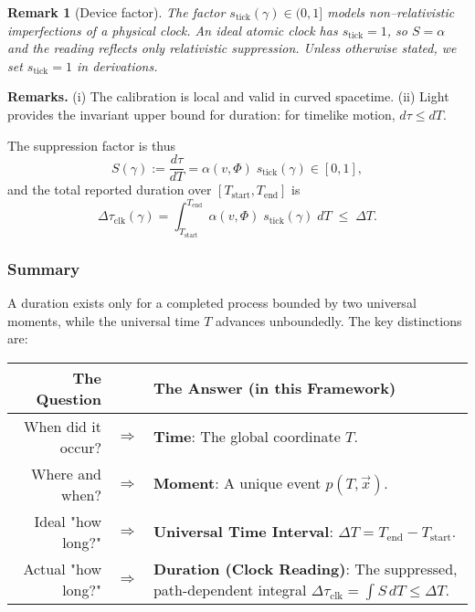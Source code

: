 \documentclass[12pt]{article}
\theoremstyle{plain}
\newtheorem{remark}{Remark}
\newcommand{\stick}{s_{\mathrm{tick}}}
\begin{document}
\begin{remark}[Device factor]
The factor $\stick(\gamma)\in(0,1]$ models non–relativistic imperfections of a physical clock. An \emph{ideal} atomic clock has $s_{\mathrm{tick}}=1$, so $S=\alpha$ and the reading reflects only relativistic suppression. Unless otherwise stated, we set $s_{\mathrm{tick}}=1$ in derivations.
\end{remark}

\noindent\textbf{Remarks.}
(i) The calibration is local and valid in curved spacetime.
(ii) Light provides the invariant upper bound for duration: for timelike motion, $d\tau\le dT$.

\medskip
\noindent The suppression factor is thus
\begin{equation}
S(\gamma):=\frac{d\tau}{dT}=\alpha(v,\Phi)\; \stick(\gamma)\in[0,1],
\label{eq:Suppression}
\end{equation}
and the total reported duration over $[T_{\mathrm{start}},T_{\mathrm{end}}]$ is
\begin{equation}
\Delta \tau_{\mathrm{clk}}(\gamma)
= \int_{T_{\mathrm{start}}}^{T_{\mathrm{end}}}
   \alpha(v,\Phi)\;\stick(\gamma)\; dT
\;\le\; \Delta T .
\label{eq:clkDuration}
\end{equation}

\subsubsection*{Summary}
A duration exists only for a completed process bounded by two universal moments, while the universal time $T$ advances unboundedly. The key distinctions are:

\begin{table}[h!]
    \centering
    \small
    \begin{tabular}{r c p{8cm}}
        \textbf{The Question} & & \textbf{The Answer (in this Framework)} \\
        \midrule
        When did it occur? & $\Rightarrow$ & \textbf{Time}: The global coordinate $T$. \\
        \addlinespace
        Where and when? & $\Rightarrow$ & \textbf{Moment}: A unique event $p(T, \vec{x})$. \\
        \addlinespace
        Ideal "how long?" & $\Rightarrow$ & \textbf{Universal Time Interval}: $\Delta T = T_{\text{end}} - T_{\text{start}}$. \\
        \addlinespace
        Actual "how long?" & $\Rightarrow$ & \textbf{Duration (Clock Reading)}: The suppressed, path-dependent integral $\Delta\tau_{\mathrm{clk}} = \int S\,dT \le \Delta T$. \\
        \bottomrule
    \end{tabular}
\end{table}
\end{document}
